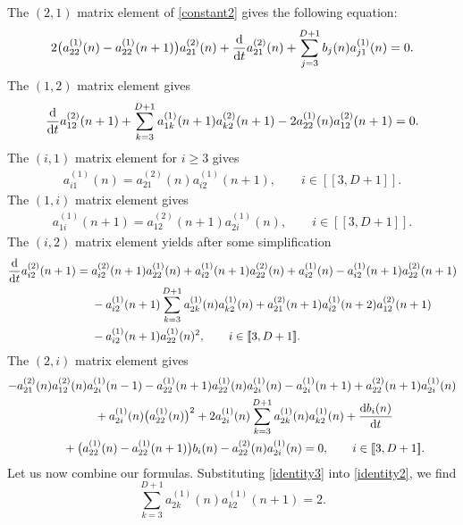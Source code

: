 \documentclass[pdftex]{sigma}
\numberwithin{equation}{section}
\begin{document}
The $(2,1)$ matrix element of \eqref{constant2} gives the following equation:
\begin{equation}\label{constant21}
 2 \big(a_{22}^{(1)}(n) - a_{22}^{(1)}(n+1) \big)a_{21}^{(2)}(n) + \frac{\rm d}{{\rm d}t} a_{21}^{(2)}(n)
+ \sum_{j=3}^{D+1} b_j(n) a_{j1}^{(1)}(n) = 0.
\end{equation}
The $(1,2)$ matrix element gives
\begin{equation}\label{constant12}
 \frac{\rm d}{{\rm d}t} a_{12}^{(2)}(n+1)+\sum_{k=3}^{D+1} a_{1k}^{(1)}(n+1)a_{k2}^{(2)}(n+1) - 2 a_{22}^{(1)}(n) a_{12}^{(2)}(n+1) = 0.
\end{equation}
The $(i,1)$ matrix element for $i\geq 3$ gives
\begin{align}\label{identity3}
a_{i1}^{(1)}(n) = a_{21}^{(2)}(n) a_{i2}^{(1)}(n+1),\qquad i \in [\![ 3, D+1]\!].
\end{align}
The $(1,i)$ matrix element gives
\begin{align}\label{identity4}
a_{1i}^{(1)}(n+1) = a_{12}^{(2)}(n+1) a_{2i}^{(1)}(n), \qquad i \in [\![ 3, D+1]\!].
\end{align}
The $(i,2)$ matrix element yields after some simplification
\begin{align*}
\frac{\rm d}{{\rm d}t}a_{i2}^{(2)}(n+1) ={}& a_{i2}^{(2)}(n+1) a_{22}^{(1)}(n) + a_{i2}^{(1)}(n+1)a_{22}^{(2)}(n) + a_{i2}^{(1)}(n)- a_{i2}^{(1)}(n+1) a_{22}^{(2)}(n+1) \\
& - a_{i2}^{(1)}(n+1) \sum_{k=3}^{D+1} a_{2k}^{(1)}(n) a_{k2}^{(1)}(n)+ a_{21}^{(2)}(n+1) a_{i2}^{(1)}(n+2) a_{12}^{(2)}(n+1) \\
& - a_{i2}^{(1)}(n+1) a_{22}^{(1)}(n)^2, \qquad i \in [\![ 3, D+1]\!] .
\end{align*}
The $(2,i)$ matrix element gives
\begin{gather*}
 -a^{(2)}_{21}(n) a_{12}^{(2)}(n) a_{2i}^{(1)}(n-1) - a_{22}^{(1)}(n+1) a_{22}^{(1)}(n) a_{2i}^{(1)}(n) - a_{2i}^{(1)}(n+1) +a_{22}^{(2)}(n+1)a_{2i}^{(1)}(n) \\
\qquad{}+a_{2i}^{(1)}(n) \big( a_{22}^{(1)}(n) \big)^2 + 2 a_{2i}^{(1)}(n) \sum_{k=3}^{D+1}a_{2k}^{(1)}(n) a_{k2}^{(1)}(n) + \frac{{\rm d} b_i(n)}{{\rm d}t} \\
\qquad{}+ \big(a_{22}^{(1)}(n) - a_{22}^{(1)}(n+1)\big) b_i(n) - a_{22}^{(2)}(n) a_{2i}^{(1)}(n) = 0,\qquad i \in [\![ 3, D+1]\!].
\end{gather*}
Let us now combine our formulas. Substituting \eqref{identity3} into \eqref{identity2}, we find
\[
\sum_{k=3}^{D+1} a_{2k}^{(1)}(n) a_{k2}^{(1)}(n+1) = 2.
\]
\end{document}
